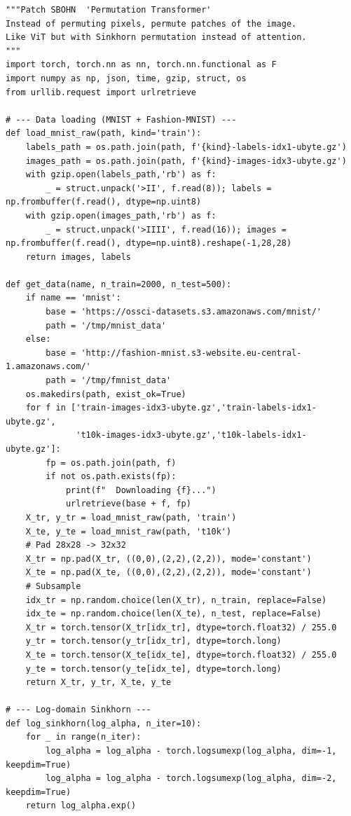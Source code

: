\documentclass[11pt,a4paper]{report}
\begin{document}
\begin{small}
\begin{verbatim}
"""Patch SBOHN  'Permutation Transformer'
Instead of permuting pixels, permute patches of the image.
Like ViT but with Sinkhorn permutation instead of attention.
"""
import torch, torch.nn as nn, torch.nn.functional as F
import numpy as np, json, time, gzip, struct, os
from urllib.request import urlretrieve

# --- Data loading (MNIST + Fashion-MNIST) ---
def load_mnist_raw(path, kind='train'):
    labels_path = os.path.join(path, f'{kind}-labels-idx1-ubyte.gz')
    images_path = os.path.join(path, f'{kind}-images-idx3-ubyte.gz')
    with gzip.open(labels_path,'rb') as f:
        _ = struct.unpack('>II', f.read(8)); labels = np.frombuffer(f.read(), dtype=np.uint8)
    with gzip.open(images_path,'rb') as f:
        _ = struct.unpack('>IIII', f.read(16)); images = np.frombuffer(f.read(), dtype=np.uint8).reshape(-1,28,28)
    return images, labels

def get_data(name, n_train=2000, n_test=500):
    if name == 'mnist':
        base = 'https://ossci-datasets.s3.amazonaws.com/mnist/'
        path = '/tmp/mnist_data'
    else:
        base = 'http://fashion-mnist.s3-website.eu-central-1.amazonaws.com/'
        path = '/tmp/fmnist_data'
    os.makedirs(path, exist_ok=True)
    for f in ['train-images-idx3-ubyte.gz','train-labels-idx1-ubyte.gz',
              't10k-images-idx3-ubyte.gz','t10k-labels-idx1-ubyte.gz']:
        fp = os.path.join(path, f)
        if not os.path.exists(fp):
            print(f"  Downloading {f}...")
            urlretrieve(base + f, fp)
    X_tr, y_tr = load_mnist_raw(path, 'train')
    X_te, y_te = load_mnist_raw(path, 't10k')
    # Pad 28x28 -> 32x32
    X_tr = np.pad(X_tr, ((0,0),(2,2),(2,2)), mode='constant')
    X_te = np.pad(X_te, ((0,0),(2,2),(2,2)), mode='constant')
    # Subsample
    idx_tr = np.random.choice(len(X_tr), n_train, replace=False)
    idx_te = np.random.choice(len(X_te), n_test, replace=False)
    X_tr = torch.tensor(X_tr[idx_tr], dtype=torch.float32) / 255.0
    y_tr = torch.tensor(y_tr[idx_tr], dtype=torch.long)
    X_te = torch.tensor(X_te[idx_te], dtype=torch.float32) / 255.0
    y_te = torch.tensor(y_te[idx_te], dtype=torch.long)
    return X_tr, y_tr, X_te, y_te

# --- Log-domain Sinkhorn ---
def log_sinkhorn(log_alpha, n_iter=10):
    for _ in range(n_iter):
        log_alpha = log_alpha - torch.logsumexp(log_alpha, dim=-1, keepdim=True)
        log_alpha = log_alpha - torch.logsumexp(log_alpha, dim=-2, keepdim=True)
    return log_alpha.exp()


\end{verbatim}
\end{small}
\end{document}
